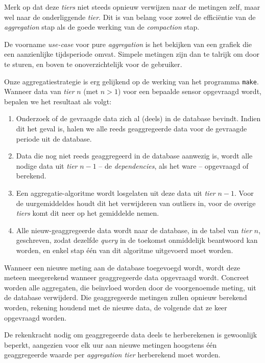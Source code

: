 \documentclass[12pt,draft,parskip=full]{article}
\begin{document}
Merk op dat deze \emph{tiers} niet steeds opnieuw verwijzen naar de metingen zelf, maar wel naar de onderliggende \emph{tier}. Dit is van belang voor zowel de effici\"entie van de \emph{aggregation} stap als de goede werking van de \emph{compaction} stap.

De voorname \emph{use-case} voor pure \emph{aggregation} is het bekijken van een grafiek die een aanzienlijke tijdsperiode omvat. Simpele metingen zijn dan te talrijk om door te sturen, en boven te onoverzichtelijk voor de gebruiker.

Onze aggregatiestrategie is erg gelijkend op de werking van het programma \texttt{make}. Wanneer data van \emph{tier} $n$ (met $n > 1$) voor een bepaalde sensor opgevraagd wordt, bepalen we het resultaat als volgt:

\begin{enumerate}
	\item Onderzoek of de gevraagde data zich al (deels) in de database bevindt. Indien dit het geval is, halen we alle reeds geaggregeerde data voor de gevraagde periode uit de database.

	\item Data die nog niet reeds geaggregeerd in de database aanwezig is, wordt alle nodige data uit \emph{tier} $n - 1$ -- de \emph{dependencies}, als het ware -- opgevraagd of berekend.

	\item Een aggregatie-algoritme wordt losgelaten uit deze data uit \emph{tier} $n - 1$. Voor de uurgemiddeldes houdt dit het verwijderen van outliers in, voor de overige \emph{tiers} komt dit neer op het gemiddelde nemen.

	\item Alle nieuw-geaggregeerde data wordt naar de database, in de tabel van \emph{tier} $n$, geschreven, zodat dezelfde \emph{query} in de toekomst onmiddelijk beantwoord kan worden, en enkel stap \'e\'en van dit algoritme uitgevoerd moet worden.
\end{enumerate}

Wanneer een nieuwe meting aan de database toegevoegd wordt, wordt deze meteen meegerekend wanneer geaggregeerde data opgevraagd wordt. Concreet worden alle aggregaten, die be\"invloed worden door de voorgenoemde meting, uit de database verwijderd. Die geaggregeerde metingen zullen opnieuw berekend worden, rekening houdend met de nieuwe data, de volgende dat ze keer opgevraagd worden.

De rekenkracht nodig om geaggregeerde data deels te herberekenen is gewoonlijk beperkt, aangezien voor elk uur aan nieuwe metingen hoogstens \'e\'en geaggregeerde waarde per \emph{aggregation tier} herberekend moet worden.
\end{document}
